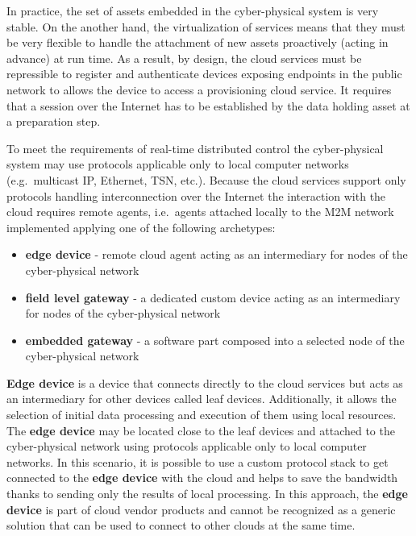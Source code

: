 \documentclass[
]{article}
\providecommand{\tightlist}{%
  \setlength{\itemsep}{0pt}\setlength{\parskip}{0pt}}
\begin{document}
In practice, the set of assets embedded in the cyber-physical system is
very stable. On the another hand, the virtualization of services means
that they must be very flexible to handle the attachment of new assets
proactively (acting in advance) at run time. As a result, by design, the
cloud services must be repressible to register and authenticate devices
exposing endpoints in the public network to allows the device to access
a provisioning cloud service. It requires that a session over the
Internet has to be established by the data holding asset at a
preparation step.

To meet the requirements of real-time distributed control the
cyber-physical system may use protocols applicable only to local
computer networks (e.g.~multicast IP, Ethernet, TSN, etc.). Because the
cloud services support only protocols handling interconnection over the
Internet the interaction with the cloud requires remote agents,
i.e.~agents attached locally to the M2M network implemented applying one
of the following archetypes:

\begin{itemize}
\tightlist
\item
  \textbf{edge device} - remote cloud agent acting as an intermediary
  for nodes of the cyber-physical network
\item
  \textbf{field level gateway} - a dedicated custom device acting as an
  intermediary for nodes of the cyber-physical network
\item
  \textbf{embedded gateway} - a software part composed into a selected
  node of the cyber-physical network
\end{itemize}

\textbf{Edge device} is a device that connects directly to the cloud
services but acts as an intermediary for other devices called leaf
devices. Additionally, it allows the selection of initial data
processing and execution of them using local resources. The \textbf{edge
device} may be located close to the leaf devices and attached to the
cyber-physical network using protocols applicable only to local computer
networks. In this scenario, it is possible to use a custom protocol
stack to get connected to the \textbf{edge device} with the cloud and
helps to save the bandwidth thanks to sending only the results of local
processing. In this approach, the \textbf{edge device} is part of cloud
vendor products and cannot be recognized as a generic solution that can
be used to connect to other clouds at the same time.
\end{document}
